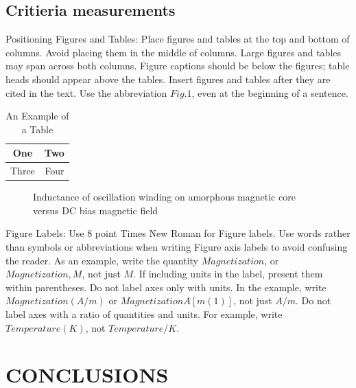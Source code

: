 \documentclass[a4paper, 10pt, conference]{ieeeconf}      %
\begin{document}
\subsection{Critieria measurements}

Positioning Figures and Tables: Place figures and tables at the top and bottom of columns. Avoid placing them in the middle of columns. Large figures and tables may span across both columns. Figure captions should be below the figures; table heads should appear above the tables. Insert figures and tables after they are cited in the text. Use the abbreviation $Fig. 1$, even at the beginning of a sentence.

\begin{table}[h]
\caption{An Example of a Table}
\label{table_example}
\begin{center}
\begin{tabular}{|c||c|}
\hline
One & Two\\
\hline
Three & Four\\
\hline
\end{tabular}
\end{center}
\end{table}


   \begin{figure}[thpb]
      \centering
      \caption{Inductance of oscillation winding on amorphous
       magnetic core versus DC bias magnetic field}
      \label{figurelabel}
   \end{figure}
   

Figure Labels: Use 8 point Times New Roman for Figure labels. Use words rather than symbols or abbreviations when writing Figure axis labels to avoid confusing the reader. As an example, write the quantity $Magnetization$, or $Magnetization, M$, not just $M$. If including units in the label, present them within parentheses. Do not label axes only with units. In the example, write $Magnetization (A/m)$ or $Magnetization {A[m(1)]}$, not just $A/m$. Do not label axes with a ratio of quantities and units. For example, write $Temperature (K)$, not $Temperature/K.$

\section{CONCLUSIONS}
\end{document}
